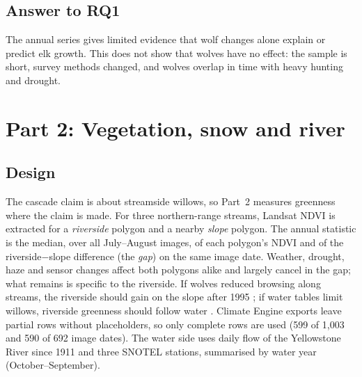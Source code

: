 \documentclass[11pt,a4paper]{article}
\begin{document}
\subsection{Answer to RQ1}
The annual series gives limited evidence that wolf changes alone explain or predict elk growth. This does not show that wolves have no effect: the sample is short, survey methods changed, and wolves overlap in time with heavy hunting and drought.

\section{Part 2: Vegetation, snow and river}
\subsection{Design}
The cascade claim is about streamside willows, so Part~2 measures greenness where the claim is made. For three northern-range streams, Landsat NDVI is extracted for a \emph{riverside} polygon and a nearby \emph{slope} polygon. The annual statistic is the median, over all July--August images, of each polygon's NDVI and of the riverside$-$slope difference (the \emph{gap}) on the same image date. Weather, drought, haze and sensor changes affect both polygons alike and largely cancel in the gap; what remains is specific to the riverside. If wolves reduced browsing along streams, the riverside should gain on the slope after 1995 \citep{ripple2004,ripple2012}; if water tables limit willows, riverside greenness should follow water \citep{bilyeu2008,marshall2013}. Climate Engine exports leave partial rows without placeholders, so only complete rows are used (599 of 1{,}003 and 590 of 692 image dates). The water side uses daily flow of the Yellowstone River since 1911 and three SNOTEL stations, summarised by water year (October--September).
\end{document}
